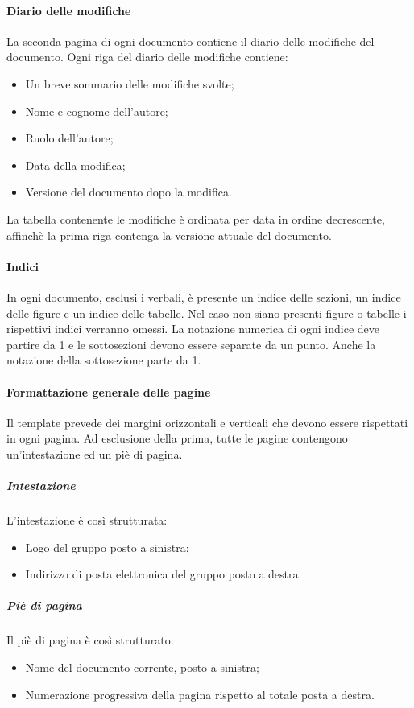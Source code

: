		\paragraph{Diario delle modifiche} \Spazio
		\label{registroModifiche}
		La seconda pagina di ogni documento contiene il diario delle modifiche del documento.
		Ogni riga del diario delle modifiche contiene:
		\begin{itemize}
			\item Un breve sommario delle modifiche svolte;
			\item Nome e cognome dell’autore;
			\item Ruolo dell’autore;
			\item Data della modifica;
			\item Versione del documento dopo la modifica.
		\end{itemize}
		La tabella contenente le modifiche è ordinata per data in ordine decrescente, affinchè la prima riga contenga la versione attuale del documento.
		
		\paragraph{Indici} \Spazio
		In ogni documento, esclusi i verbali, è presente un indice delle sezioni, un indice delle figure e un indice delle tabelle. Nel caso non siano presenti figure o tabelle i rispettivi indici verranno omessi. La notazione numerica di ogni indice deve partire da 1 e le sottosezioni devono essere separate da un punto. Anche la notazione della sottosezione parte da 1.
		
		\paragraph{Formattazione generale delle pagine} \Spazio
		Il template prevede dei margini orizzontali e verticali che devono essere rispettati in ogni pagina. Ad esclusione della prima, tutte le pagine contengono un’intestazione ed un piè di pagina. 
			
			\subparagraph{Intestazione} \Spazio
			L’intestazione è così strutturata:
			\begin{itemize}
				\item Logo del gruppo posto a sinistra;
				\item Indirizzo di posta elettronica del gruppo posto a destra.
			\end{itemize}
			
			\subparagraph{Piè di pagina} \Spazio
			Il piè di pagina è così strutturato:
			\begin{itemize}
				\item Nome del documento corrente, posto a sinistra;
				\item Numerazione progressiva della pagina rispetto al totale posta a destra.
			\end{itemize}
		
